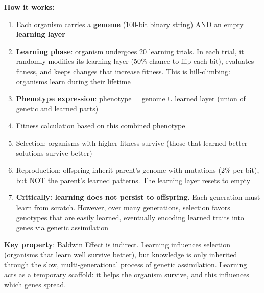 \documentclass[12pt]{article}
\begin{document}
\textbf{How it works:}
\begin{enumerate}
\item Each organism carries a \textbf{genome} (100-bit binary string) AND an empty \textbf{learning layer}
\item \textbf{Learning phase}: organism undergoes 20 learning trials. In each trial, it randomly modifies its learning layer (50\% chance to flip each bit), evaluates fitness, and keeps changes that increase fitness. This is hill-climbing: organisms learn during their lifetime
\item \textbf{Phenotype expression}: phenotype = genome $\cup$ learned layer (union of genetic and learned parts)
\item Fitness calculation based on this combined phenotype
\item Selection: organisms with higher fitness survive (those that learned better solutions survive better)
\item Reproduction: offspring inherit parent's genome with mutations (2\% per bit), but NOT the parent's learned patterns. The learning layer resets to empty
\item \textbf{Critically: learning does not persist to offspring}. Each generation must learn from scratch. However, over many generations, selection favors genotypes that are easily learned, eventually encoding learned traits into genes via genetic assimilation
\end{enumerate}

\textbf{Key property}: Baldwin Effect is indirect. Learning influences selection (organisms that learn well survive better), but knowledge is only inherited through the slow, multi-generational process of genetic assimilation. Learning acts as a temporary scaffold: it helps the organism survive, and this influences which genes spread.
\end{document}
